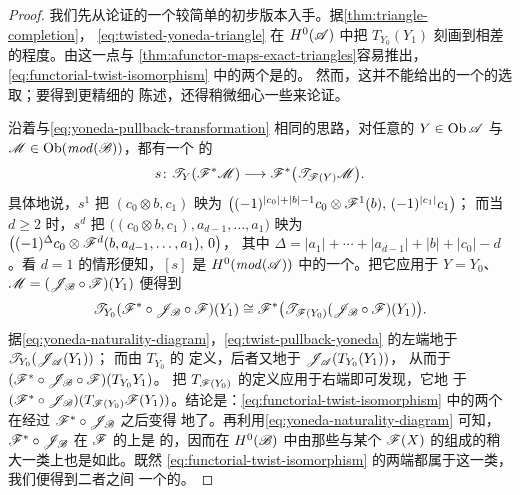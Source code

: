 \begin{proof}
我们先从论证的一个较简单的初步版本入手。据\cref{thm:triangle-completion}，%
\trExactTriangle{} \eqref{eq:twisted-yoneda-triangle} 在 $H^0(\mathscr{A})$ 中把
$T_{Y_0}(Y_1)$ 刻画到相差\trIsomorphism{}的程度。由这一点与%
\cref{thm:afunctor-maps-exact-triangles}容易推出，%
\eqref{eq:functorial-twist-isomorphism} 中的两个\trObject{}是\trIsomorphic{}的。
然而，这并不能给出\trIsomorphism{}的一个\trCanonical{}的选取；要得到更精细的
陈述，还得稍微细心一些来论证。

沿着与\eqref{eq:yoneda-pullback-transformation} 相同的思路，对任意的
$Y\in\operatorname{Ob}\mathscr{A}$ 与 $\mathscr{M}\in\operatorname{Ob}(\mathit{mod}(\mathscr{B}))$，都有一个%
\trCanonical{}的\trModule{}\trHomomorphism
\begin{equation*}
s\colon\mathscr{T}_Y(\mathscr{F}^*\mathscr{M})\longrightarrow
\mathscr{F}^*\bigl(\mathscr{T}_{\mathscr{F}(Y)}\mathscr{M}\bigr).
\end{equation*}
具体地说，$s^1$ 把 $(c_0\otimes b,c_1)$ 映为
$\bigl((-1)^{|c_0|+|b|-1}c_0\otimes\mathscr{F}^1(b),\,(-1)^{|c_1|}c_1\bigr)$；
而当 $d\ge 2$ 时，$s^d$ 把
$\bigl((c_0\otimes b,c_1),a_{d-1},\ldots,a_1\bigr)$ 映为
$\bigl((-1)^{\Delta}c_0\otimes\mathscr{F}^d(b,a_{d-1},\ldots,a_1),\,0\bigr)$，
其中 $\Delta=|a_1|+\cdots+|a_{d-1}|+|b|+|c_0|-d$。看 $d=1$ 的情形便知，$[s]$
是 $H^0(\mathit{mod}(\mathscr{A}))$ 中的一个\trIsomorphism。把它应用于
$Y=Y_0$、$\mathscr{M}=(\mathscr{J}_{\mathscr{B}}\circ\mathscr{F})(Y_1)$ 便得到
\begin{equation}\label{eq:twist-pullback-yoneda}
\mathscr{T}_{Y_0}(\mathscr{F}^*\circ\mathscr{J}_{\mathscr{B}}\circ\mathscr{F})(Y_1)\cong
\mathscr{F}^*\bigl(\mathscr{T}_{\mathscr{F}(Y_0)}(\mathscr{J}_{\mathscr{B}}\circ\mathscr{F})(Y_1)\bigr).
\end{equation}
据\eqref{eq:yoneda-naturality-diagram}，\eqref{eq:twist-pullback-yoneda}
的左端\trCanonical{}地\trIsomorphic{}于 $\mathscr{T}_{Y_0}(\mathscr{J}_{\mathscr{A}}(Y_1))$；
而由 $T_{Y_0}$ 的
定义，后者又\trCanonical{}地\trIsomorphic{}于 $\mathscr{J}_{\mathscr{A}}(T_{Y_0}(Y_1))$，
从而\trIsomorphic{}于 $(\mathscr{F}^*\circ\mathscr{J}_{\mathscr{B}}\circ\mathscr{F})(T_{Y_0}Y_1)$。
把 $T_{\mathscr{F}(Y_0)}$ 的定义应用于右端即可发现，它\trCanonical{}地%
\trIsomorphic{}于 $(\mathscr{F}^*\circ\mathscr{J}_{\mathscr{B}})
(T_{\mathscr{F}(Y_0)}\mathscr{F}(Y_1))$。结论是：\eqref{eq:functorial-twist-isomorphism}
中的两个\trObject{}在经过 $\mathscr{F}^*\circ\mathscr{J}_{\mathscr{B}}$ 之后变得%
\trCanonical{}地\trIsomorphic{}了。再利用\eqref{eq:yoneda-naturality-diagram}
可知，$\mathscr{F}^*\circ\mathscr{J}_{\mathscr{B}}$ 在 $\mathscr{F}$ 的\trImage{}上是%
\trCohomology\trFullyFaithful{}的，因而在 $H^0(\mathscr{B})$ 中由那些与某个
$\mathscr{F}(X)$ \trIsomorphic{}的\trObject{}组成的稍大一类上也是如此。既然
\eqref{eq:functorial-twist-isomorphism} 的两端都属于这一类，我们便得到二者之间
一个\trCanonical{}的\trIsomorphism。
\end{proof}

